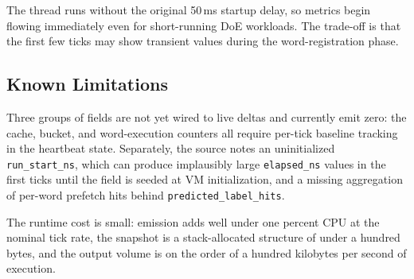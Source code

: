 The thread runs without the original 50\,ms startup delay, so metrics begin
flowing immediately even for short-running DoE workloads. The trade-off is
that the first few ticks may show transient values during the word-registration
phase.

\subsection{Known Limitations}

Three groups of fields are not yet wired to live deltas and currently emit
zero: the cache, bucket, and word-execution counters all require per-tick
baseline tracking in the heartbeat state. Separately, the source notes an
uninitialized \texttt{run\_start\_ns}, which can produce implausibly large
\texttt{elapsed\_ns} values in the first ticks until the field is seeded at
VM initialization, and a missing aggregation of per-word prefetch hits behind
\texttt{predicted\_label\_hits}.


The runtime cost is small: emission adds well under one percent CPU at the
nominal tick rate, the snapshot is a stack-allocated structure of under a
hundred bytes, and the output volume is on the order of a hundred kilobytes
per second of execution.
